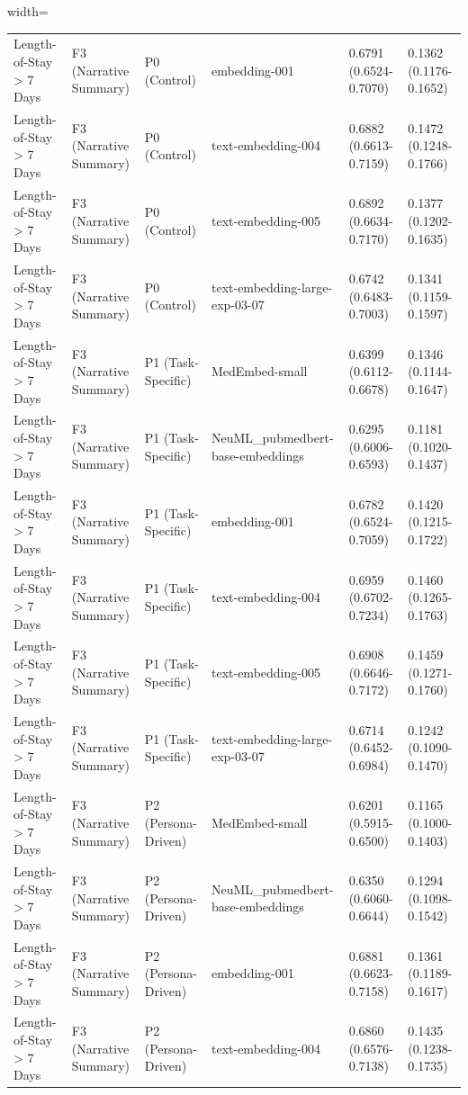 \documentclass[border=0pt]{standalone}
\begin{document}
\begin{adjustbox}{width=\textwidth}
\begin{tabular}{llllll}
Length-of-Stay \textgreater{} 7 Days & F3 (Narrative Summary) & P0 (Control) & embedding-001 & 0.6791 (0.6524-0.7070) & 0.1362 (0.1176-0.1652) \\
Length-of-Stay \textgreater{} 7 Days & F3 (Narrative Summary) & P0 (Control) & text-embedding-004 & 0.6882 (0.6613-0.7159) & 0.1472 (0.1248-0.1766) \\
Length-of-Stay \textgreater{} 7 Days & F3 (Narrative Summary) & P0 (Control) & text-embedding-005 & 0.6892 (0.6634-0.7170) & 0.1377 (0.1202-0.1635) \\
Length-of-Stay \textgreater{} 7 Days & F3 (Narrative Summary) & P0 (Control) & text-embedding-large-exp-03-07 & 0.6742 (0.6483-0.7003) & 0.1341 (0.1159-0.1597) \\
Length-of-Stay \textgreater{} 7 Days & F3 (Narrative Summary) & P1 (Task-Specific) & MedEmbed-small & 0.6399 (0.6112-0.6678) & 0.1346 (0.1144-0.1647) \\
Length-of-Stay \textgreater{} 7 Days & F3 (Narrative Summary) & P1 (Task-Specific) & NeuML\_pubmedbert-base-embeddings & 0.6295 (0.6006-0.6593) & 0.1181 (0.1020-0.1437) \\
Length-of-Stay \textgreater{} 7 Days & F3 (Narrative Summary) & P1 (Task-Specific) & embedding-001 & 0.6782 (0.6524-0.7059) & 0.1420 (0.1215-0.1722) \\
Length-of-Stay \textgreater{} 7 Days & F3 (Narrative Summary) & P1 (Task-Specific) & text-embedding-004 & 0.6959 (0.6702-0.7234) & 0.1460 (0.1265-0.1763) \\
Length-of-Stay \textgreater{} 7 Days & F3 (Narrative Summary) & P1 (Task-Specific) & text-embedding-005 & 0.6908 (0.6646-0.7172) & 0.1459 (0.1271-0.1760) \\
Length-of-Stay \textgreater{} 7 Days & F3 (Narrative Summary) & P1 (Task-Specific) & text-embedding-large-exp-03-07 & 0.6714 (0.6452-0.6984) & 0.1242 (0.1090-0.1470) \\
Length-of-Stay \textgreater{} 7 Days & F3 (Narrative Summary) & P2 (Persona-Driven) & MedEmbed-small & 0.6201 (0.5915-0.6500) & 0.1165 (0.1000-0.1403) \\
Length-of-Stay \textgreater{} 7 Days & F3 (Narrative Summary) & P2 (Persona-Driven) & NeuML\_pubmedbert-base-embeddings & 0.6350 (0.6060-0.6644) & 0.1294 (0.1098-0.1542) \\
Length-of-Stay \textgreater{} 7 Days & F3 (Narrative Summary) & P2 (Persona-Driven) & embedding-001 & 0.6881 (0.6623-0.7158) & 0.1361 (0.1189-0.1617) \\
Length-of-Stay \textgreater{} 7 Days & F3 (Narrative Summary) & P2 (Persona-Driven) & text-embedding-004 & 0.6860 (0.6576-0.7138) & 0.1435 (0.1238-0.1735) \\

\end{tabular}
\end{adjustbox}
\end{document}
